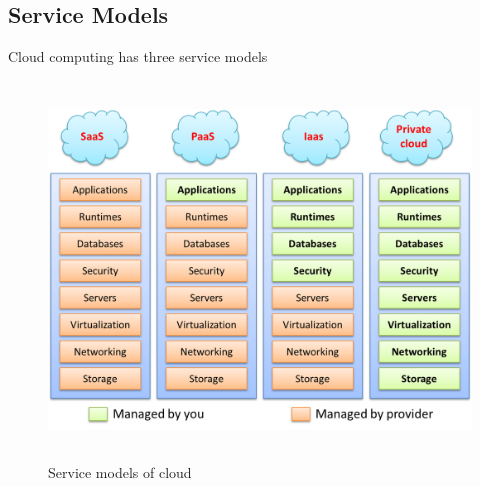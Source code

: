     \subsection{Service Models}
    Cloud computing has three service models
    
    \begin{figure}[h]
        \centering
        \includegraphics[width=14cm,height=10cm]{images/service_models2.png}
        \caption{Service models of cloud}
    \end{figure}
    
